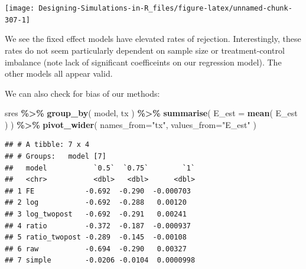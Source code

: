 \documentclass[
]{book}
\newenvironment{Shaded}{\begin{snugshade}}{\end{snugshade}}
\newcommand{\AttributeTok}[1]{\textcolor[rgb]{0.13,0.29,0.53}{#1}}
\newcommand{\DecValTok}[1]{\textcolor[rgb]{0.00,0.00,0.81}{#1}}
\newcommand{\FloatTok}[1]{\textcolor[rgb]{0.00,0.00,0.81}{#1}}
\newcommand{\FunctionTok}[1]{\textcolor[rgb]{0.13,0.29,0.53}{\textbf{#1}}}
\newcommand{\NormalTok}[1]{#1}
\newcommand{\SpecialCharTok}[1]{\textcolor[rgb]{0.81,0.36,0.00}{\textbf{#1}}}
\newcommand{\StringTok}[1]{\textcolor[rgb]{0.31,0.60,0.02}{#1}}
\begin{document}
\begin{Shaded}
\end{Shaded}

\begin{center}\texttt{[image: Designing-Simulations-in-R\_files/figure-latex/unnamed-chunk-307-1]} \end{center}

We see the fixed effect models have elevated rates of rejection.
Interestingly, these rates do not seem particularly dependent on sample size or treatment-control imbalance (note lack of significant coefficeints on our regression model).
The other models all appear valid.

We can also check for bias of our methods:

\begin{Shaded}
\begin{Highlighting}[]
\NormalTok{sres }\SpecialCharTok{\%\textgreater{}\%} \FunctionTok{group\_by}\NormalTok{( model, tx ) }\SpecialCharTok{\%\textgreater{}\%}
  \FunctionTok{summarise}\NormalTok{( }\AttributeTok{E\_est =} \FunctionTok{mean}\NormalTok{( E\_est ) ) }\SpecialCharTok{\%\textgreater{}\%}
  \FunctionTok{pivot\_wider}\NormalTok{( }\AttributeTok{names\_from=}\StringTok{"tx"}\NormalTok{, }\AttributeTok{values\_from=}\StringTok{"E\_est"}\NormalTok{ )}
\end{Highlighting}
\end{Shaded}

\begin{verbatim}
## # A tibble: 7 x 4
## # Groups:   model [7]
##   model           `0.5`  `0.75`        `1`
##   <chr>           <dbl>   <dbl>      <dbl>
## 1 FE            -0.692  -0.290  -0.000703 
## 2 log           -0.692  -0.288   0.00120  
## 3 log_twopost   -0.692  -0.291   0.00241  
## 4 ratio         -0.372  -0.187  -0.000937 
## 5 ratio_twopost -0.289  -0.145  -0.00108  
## 6 raw           -0.694  -0.290   0.00327  
## 7 simple        -0.0206 -0.0104  0.0000998
\end{verbatim}
\end{document}
